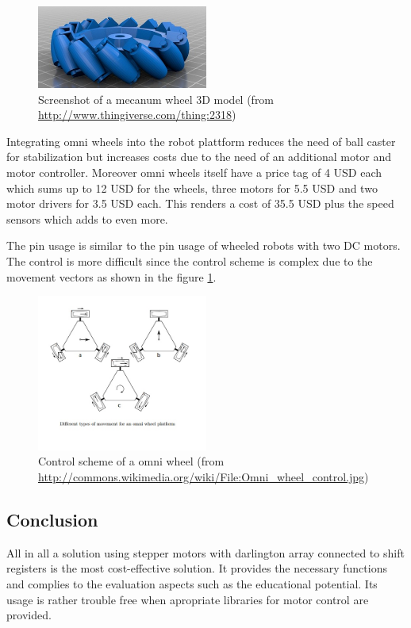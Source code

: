 \begin{figure}[H]
  \centering
  \includegraphics[width=0.5\textwidth]{images/mecanum.png}
  \caption{Screenshot of a mecanum wheel 3D model (from \url{http://www.thingiverse.com/thing:2318})}
\end{figure}

Integrating omni wheels into the robot plattform reduces the need of ball caster for stabilization but increases costs due to the need of an additional motor and motor controller. Moreover omni wheels itself have a price tag of 4 USD each which sums up to 12 USD for the wheels, three motors for 5.5 USD and two motor drivers for 3.5 USD each. This renders a cost of 35.5 USD plus the speed sensors which adds to even more. 

The pin usage is similar to the pin usage of wheeled robots with two DC motors. The control is more difficult since the control scheme is complex due to the movement vectors as shown in the figure \ref{fig:omnicontrol}.

\begin{figure}[H]
  \centering
  \includegraphics[width=0.5\textwidth]{images/omniwheel.jpg}
  \caption{Control scheme of a omni wheel (from \url{http://commons.wikimedia.org/wiki/File:Omni\_wheel\_control.jpg})}
  \label{fig:omnicontrol}
\end{figure}


\subsection{Conclusion}
All in all a solution using stepper motors with darlington array connected to shift registers is the most cost-effective solution. It provides the necessary functions and complies to the evaluation aspects such as the educational potential. Its usage is rather trouble free when apropriate libraries for motor control are provided.

